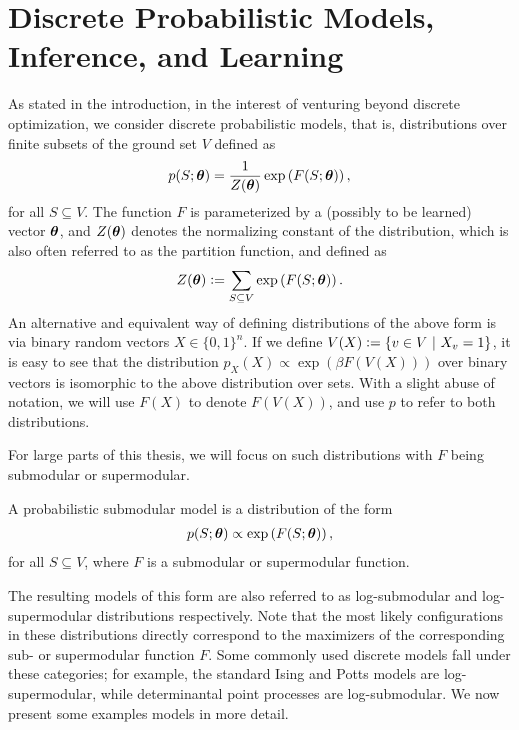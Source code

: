 \section{Discrete Probabilistic Models, Inference, and Learning}
As stated in the introduction, in the interest of venturing beyond discrete optimization, we consider discrete probabilistic models, that is, distributions over finite subsets of the ground set $V$ defined as
\begin{align*}
p(S; \bm{\theta}) = \frac{1}{Z(\bm{\theta})} \exp\left( F(S; \bm{\theta}) \right),
\end{align*}
for all $S \subseteq V$.
The function $F$ is parameterized by a (possibly to be learned) vector $\bm{\theta}$, and $Z(\bm{\theta})$ denotes the normalizing constant of the distribution, which is also often referred to as the partition function, and defined as
\begin{align*}
Z(\bm{\theta}) \vcentcolon= \sum_{S \subseteq V} \exp\left( F(S; \bm{\theta}) \right).
\end{align*}
An alternative and equivalent way of defining distributions of the above form is via binary random vectors $X \in \{0, 1\}^n$.
If we define $V(X) \vcentcolon= \left\{v \in V\ \middle\vert\  X_v = 1\right\}$, it is easy to see that the distribution $p_X(X) \propto \exp(\beta F(V(X)))$ over binary vectors is isomorphic to the above distribution over sets.
With a slight abuse of notation, we will use $F(X)$ to denote $F(V(X))$, and use $p$ to refer to both distributions.

For large parts of this thesis, we will focus on such distributions with $F$ being submodular or supermodular.
\begin{definition}
A probabilistic submodular model \citep{djolonga14,gotovos15} is a distribution of the form
\begin{align*}
p(S; \bm{\theta}) \propto \exp\left( F(S; \bm{\theta}) \right),
\end{align*}
for all $S \subseteq V$, where $F$ is a submodular or supermodular function.
\end{definition}
The resulting models of this form are also referred to as log-submodular and log-supermodular distributions respectively.
Note that the most likely configurations in these distributions directly correspond to the maximizers of the corresponding sub- or supermodular function $F$.
Some commonly used discrete models fall under these categories; for example, the standard Ising and Potts models are log-supermodular, while determinantal point processes are log-submodular.
We now present some examples models in more detail.

